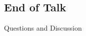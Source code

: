 \subsection{End of Talk}
\begin{frame}
  \hypertarget<1>{hyperref:endoftalk}{}
  \vfill
  \begin{centering}
    {\LARGE Questions and Discussion}
    \par
  \end{centering}
  \vfill
\end{frame}


